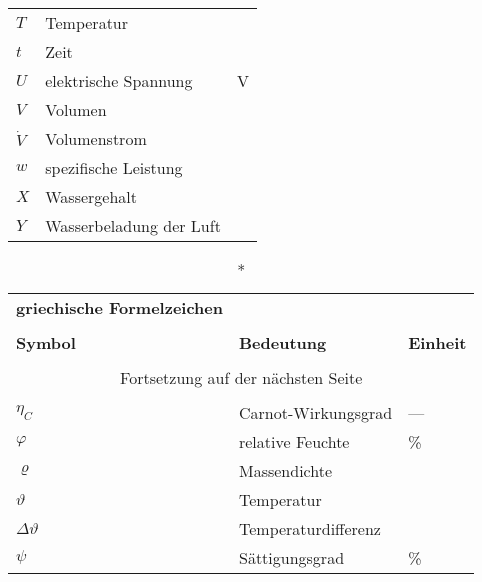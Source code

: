 \begin{onehalfspacing}
\begin{longtable}[h]{p{} p{} p{}}
		$T$ & Temperatur & \kelvin\\
		$t$ & Zeit & \second\\
		$U$ & elektrische Spannung & V \\
		$V$ & Volumen & \cubic\meter\\
		$\dot{V}$&Volumenstrom&\cubic\meter\per\second\\
		$w$ & spezifische Leistung & \watt \per \kilogram\\
		$X$	& Wassergehalt & \kilogram \per \kilogram \\
		$Y$ & Wasserbeladung der Luft & \gram\per\kilogram\\
		
\end{longtable}

\begin{longtable}[h]{p{} p{} p{}}
		\caption*{\textbf{griechische Formelzeichen}} \\
		\\
		\textbf{Symbol} & \textbf{Bedeutung} & \textbf{Einheit} \\ %
		\endhead
		\\
		\multicolumn{3}{c}{Fortsetzung auf der nächsten Seite} \\
		\endfoot
		\multicolumn{3}{c}{ } \\
		\endlastfoot
		
		$\eta_{C}$ & Carnot-Wirkungsgrad & ---\\
		$\varphi$ & relative Feuchte & \% \\
		$\varrho$& Massendichte&\kilogrampercubicmetre\\
		$\vartheta $ & Temperatur  & \degreecelsius\\
		$\Delta\vartheta $ & Temperaturdifferenz  &\kelvin\\
		$\psi$ & Sättigungsgrad & \% \\
\end{longtable}


\end{onehalfspacing}
